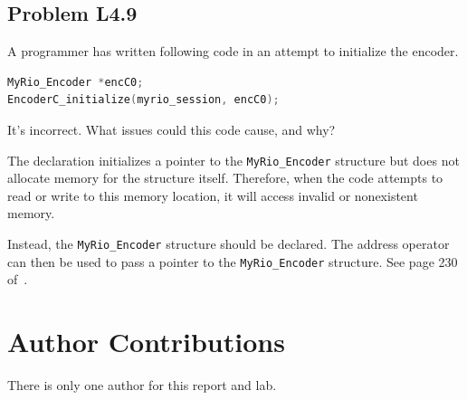\documentclass[10pt,twocolumn]{article}
\begin{document}
\subsection{Problem L4.9}
A programmer has written following code in an attempt to
initialize the encoder.
\begin{lstlisting}[language=C]
MyRio_Encoder *encC0;
EncoderC_initialize(myrio_session, encC0);
\end{lstlisting}
It's incorrect. What issues could this code cause, and why?

\vspace{\baselineskip}
The declaration initializes a pointer to the \texttt{MyRio\_Encoder} structure but does not allocate
memory for the structure itself. Therefore, when the code attempts to read or write
to this memory location, it will access invalid or nonexistent memory.

Instead, the \texttt{MyRio\_Encoder} structure should be declared. The address operator
can then be used to pass a pointer to the \texttt{MyRio\_Encoder} structure. See page 230
of~\cite{Picone2024}.

\section{Author Contributions}

There is only one author for this report and lab.







\end{document}
